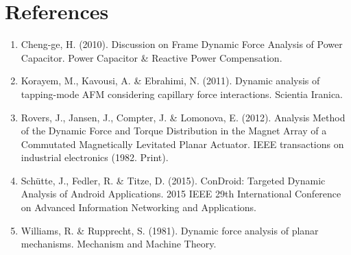 \documentclass[12pt, titlepage]{article}
\begin{document}
\section{References}
\begin{enumerate}
    \item \label{item:cheng2010} Cheng-ge, H. (2010). Discussion on Frame
      Dynamic Force Analysis of Power Capacitor. Power Capacitor \& Reactive
      Power Compensation.

    \item \label{item:korayem2011} Korayem, M., Kavousi, A. \& Ebrahimi, N.
    (2011). Dynamic analysis of tapping-mode AFM considering capillary force
    interactions. Scientia Iranica.

    \item \label{item:rovers2012} Rovers, J., Jansen, J., Compter, J. \&
    Lomonova, E. (2012). Analysis Method of the Dynamic Force and Torque
    Distribution in the Magnet Array of a Commutated Magnetically Levitated
    Planar Actuator. IEEE transactions on industrial electronics (1982. Print).

    \item \label{item:shutte2015} Schütte, J., Fedler, R. \& Titze, D. (2015).
    ConDroid: Targeted Dynamic Analysis of Android Applications. 2015 IEEE 29th
    International Conference on Advanced Information Networking and
    Applications.

    \item \label{item:williams1981} Williams, R. \& Rupprecht, S. (1981). Dynamic
    force analysis of planar mechanisms. Mechanism and Machine Theory.
\end{enumerate}
\end{document}
